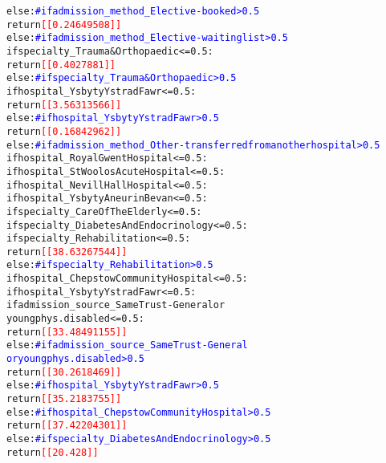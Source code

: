 \documentclass[thesis.tex]{subfiles}
\begin{document}
{\begin{alltt}
            else:  \textcolor{blue}{# if admission_method_Elective - booked > 0.5}
                return \textcolor{red}{[[0.24649508]]}
        else:  \textcolor{blue}{# if admission_method_Elective - waiting list > 0.5}
            if specialty_Trauma & Orthopaedic <= 0.5:
                return \textcolor{red}{[[0.4027881]]}
            else:  \textcolor{blue}{# if specialty_Trauma & Orthopaedic > 0.5}
                if hospital_Ysbyty Ystrad Fawr <= 0.5:
                    return \textcolor{red}{[[3.56313566]]}
                else:  \textcolor{blue}{# if hospital_Ysbyty Ystrad Fawr > 0.5}
                    return \textcolor{red}{[[0.16842962]]}
    else:  \textcolor{blue}{# if admission_method_Other - transferred from another hospital > 0.5}
        if hospital_Royal Gwent Hospital <= 0.5:
            if hospital_St Woolos Acute Hospital <= 0.5:
                if hospital_Nevill Hall Hospital <= 0.5:
                    if hospital_Ysbyty Aneurin Bevan <= 0.5:
                        if specialty_Care Of The Elderly <= 0.5:
                            if specialty_Diabetes And Endocrinology <= 0.5:
                                if specialty_Rehabilitation <= 0.5:
                                    return \textcolor{red}{[[38.63267544]]}
                                else:  \textcolor{blue}{# if specialty_Rehabilitation > 0.5}
                                    if hospital_Chepstow Community Hospital <= 0.5:
                                        if hospital_Ysbyty Ystrad Fawr <= 0.5:
                                            if admission_source_Same Trust-General or
                                            young phys.disabled <= 0.5:
                                                return \textcolor{red}{[[33.48491155]]}
                                            else:  \textcolor{blue}{# if admission_source_Same Trust-General}
                                            \textcolor{blue}{or young phys.disabled > 0.5}
                                                return \textcolor{red}{[[30.2618469]]}
                                        else:  \textcolor{blue}{# if hospital_Ysbyty Ystrad Fawr > 0.5}
                                            return \textcolor{red}{[[35.2183755]]}
                                    else:  \textcolor{blue}{# if hospital_Chepstow Community Hospital > 0.5}
                                        return \textcolor{red}{[[37.42204301]]}
                            else:  \textcolor{blue}{# if specialty_Diabetes And Endocrinology > 0.5}
                                return \textcolor{red}{[[20.428]]}

\end{alltt}}
\end{document}
